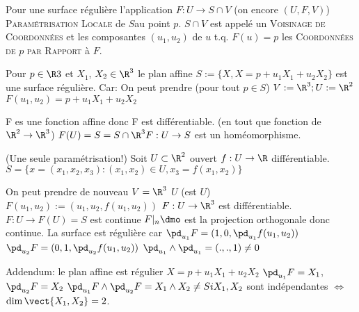 \begin{definition}
	Pour une surface régulière l'application $F:U\rightarrow S\cap V$ (on encore $(U,F,V)$) \textsc{Paramétrisation Locale} de $S $au point $p$.
	$S\cap V$ est appelé un \textsc{Voisinage de Coordonnées} et les composantes $(u_1,u_2)$ de $u$ t.q. $F(u)=p$ les \textsc{Coordonnées de $p$ par Rapport} à $F$.
\end{definition}
\begin{example}
	Pour $p\in \R3$ et $X_1$, $X_2\in \R^3$ le plan affine $S:=\{X, X=p+u_1X_1+u_2X_2 \}$ est une surface régulière. Car: On peut prendre (pour tout $p\in S$) $V:=\R^3; U:=\R^2$
	$F(u_1, u_2)=p+u_1X_1+u_2X_2$
	
	F es une fonction affine donc F est différentiable. (en tout que fonction de $\R^2\rightarrow\R^3$)
	$F(U)=S=S\cap\R^3 F:U\rightarrow S$ est un homéomorphisme.
\end{example}
\begin{example}
	(Une seule paramétrisation!) Soit $U\subset \R^2$ ouvert $f:U\rightarrow\R$ différentiable. $S=\{x=(x_1,x_2,x_3): (x_1,x_2)\in U, x_3=f(x_1, x_2)\}$
	
	On peut prendre de nouveau $V=\R^3$ $U$ (est $U$)
	$F(u_1,u_2):=(u_1, u_2, f(u_1, u_2))$ $F:U\rightarrow\R^3$ est différentiable. $F:U\rightarrow F(U)=S$ est continue $F|_n\dmo$ est la projection orthogonale donc continue. La surface est régulière car 
	$\pd_{u_1}F=(1,0,\pd_{u_1}f(u_1,u_2))$
	$\pd_{u_2}F=(0,1,\pd_{u_2}f(u_1,u_2))$
	$\pd_{u_1}\wedge\pd_{u_1}= (.,.,1)\neq 0$
	
	Addendum: le plan affine est régulier
	$X=p+u_1X_1+u_2X_2$
	$\pd_{u_1}F=X_1$, $\pd_{u_2}F=X_2$
	$\pd_{u_1}F\wedge\pd_{u_2}F=X_1\wedge X_2\neq Si X_1,X_2$ sont indépendantes $\Leftrightarrow$ $\dim \vect\{X_1, X_2\}=2$.
\end{example}

